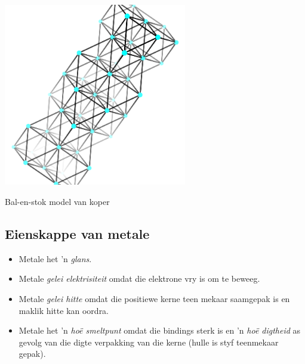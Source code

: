 \begin{minipage}{.5\textwidth}
 \begin{center}
  \includegraphics[width=0.6\textwidth]{photos/copper_structure.png}\\
\begin{caption}{Bal-en-stok model van koper}\end{caption}
 \end{center}

\end{minipage}
\subsection*{Eienskappe van metale}
\begin{itemize}
 \item Metale het   'n \textsl{glans}.
\item Metale \textsl{gelei elektrisiteit} omdat die elektrone vry is om te beweeg.
\item Metale \textsl{gelei hitte} omdat die positiewe kerne teen mekaar saamgepak is en maklik hitte kan oordra.
\item Metale het  'n \textsl{ho\"{e} smeltpunt} omdat die bindings sterk is en  'n \textsl{ho\"{e} digtheid} as gevolg van die digte verpakking van die kerne (hulle is styf teenmekaar gepak).
\end{itemize}

